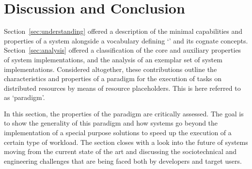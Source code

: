 \documentclass{sig-alternate}
\begin{document}
%
\section{Discussion and Conclusion}
\label{sec:discussion}





Section~\ref{sec:understanding} offered a description of the minimal
capabilities and properties of a \pilot system alongside a vocabulary defining
`\pilot' and its cognate concepts. Section~\ref{sec:analysis} offered a
classification of the core and auxiliary properties of \pilot system
implementations, and the analysis of an exemplar set of \pilot system
implementations. Considered altogether, these contributions outline the
characteristics and properties of a paradigm for the execution of tasks on
distributed resources by means of resource placeholders. This is here referred
to as `\pilot paradigm'.

In this section, the properties of the \pilot paradigm are critically assessed.
The goal is to show the generality of this paradigm and how \pilot systems go
beyond the implementation of a special purpose solutions to speed up the
execution of a certain type of workload.
The section closes with a look into the future of \pilot systems moving from the
current state of the art and discussing the sociotechnical and engineering
challenges that are being faced both by developers and target users.
\end{document}
